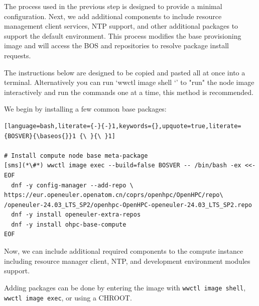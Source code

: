 The process used in the previous step is designed to
provide a minimal \baseOS{} configuration. Next, we add additional components
to include resource management client services, NTP support, and
other additional packages to support the default \OHPC{} environment. This
process modifies the base provisioning image and will access the BOS and \OHPC{}
repositories to resolve package install requests.

The instructions below are designed to be copied and pasted all at once into
a terminal.  Alternatively you can run `wwctl image shell \baseos{}`'
to "run" the node image interactively and run the commands one at a time, this
method is recommended.

We begin by installing a few
common base packages:

\begin{lstlisting}[language=bash,literate={-}{-}1,keywords={},upquote=true,literate={BOSVER}{\baseos{}}1 {\ }{\ }1]

# Install compute node base meta-package
[sms](*\#*) wwctl image exec --build=false BOSVER -- /bin/bash -ex <<- EOF
  dnf -y config-manager --add-repo \
https://eur.openeuler.openatom.cn/coprs/openhpc/OpenHPC/repo\
/openeuler-24.03_LTS_SP2/openhpc-OpenHPC-openeuler-24.03_LTS_SP2.repo
  dnf -y install openeuler-extra-repos
  dnf -y install ohpc-base-compute
EOF
\end{lstlisting}

\noindent Now, we can include additional required components to the compute
instance including resource manager client, NTP, and development environment modules support.

Adding packages can be done by entering the image with \texttt{wwctl image shell},
\texttt{wwctl image exec}, or using a CHROOT.

